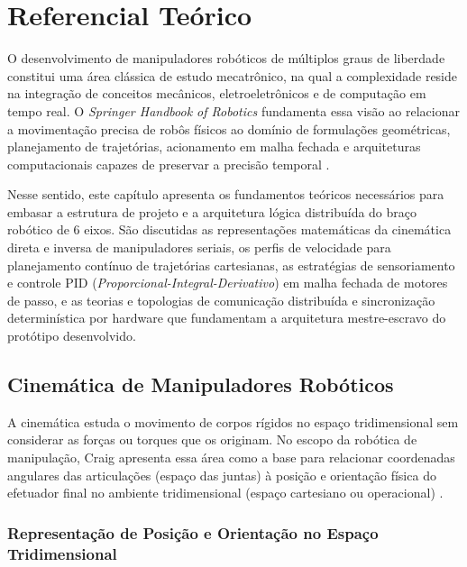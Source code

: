 \chapter{Referencial Teórico}
\label{cap:referencial_teorico}

O desenvolvimento de manipuladores robóticos de múltiplos graus de liberdade constitui uma área clássica de estudo mecatrônico, na qual a complexidade reside na integração de conceitos mecânicos, eletroeletrônicos e de computação em tempo real. O \textit{Springer Handbook of Robotics} fundamenta essa visão ao relacionar a movimentação precisa de robôs físicos ao domínio de formulações geométricas, planejamento de trajetórias, acionamento em malha fechada e arquiteturas computacionais capazes de preservar a precisão temporal \cite{siciliano2016springer}. 

Nesse sentido, este capítulo apresenta os fundamentos teóricos necessários para embasar a estrutura de projeto e a arquitetura lógica distribuída do braço robótico de 6 eixos. São discutidas as representações matemáticas da cinemática direta e inversa de manipuladores seriais, os perfis de velocidade para planejamento contínuo de trajetórias cartesianas, as estratégias de sensoriamento e controle PID (\textit{Proporcional-Integral-Derivativo}) em malha fechada de motores de passo, e as teorias e topologias de comunicação distribuída e sincronização determinística por hardware que fundamentam a arquitetura mestre-escravo do protótipo desenvolvido.

\section{Cinemática de Manipuladores Robóticos}
\label{sec:cinematica_manipuladores}

A cinemática estuda o movimento de corpos rígidos no espaço tridimensional sem considerar as forças ou torques que os originam. No escopo da robótica de manipulação, Craig apresenta essa área como a base para relacionar coordenadas angulares das articulações (espaço das juntas) à posição e orientação física do efetuador final no ambiente tridimensional (espaço cartesiano ou operacional) \cite{craig2005introduction}.

\subsection{Representação de Posição e Orientação no Espaço Tridimensional}
\label{subsec:representacao_espacial}

